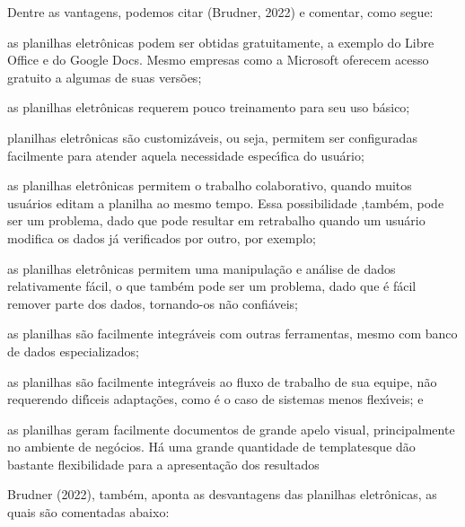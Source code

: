 \documentclass[
12pt,		%
openright,	%
twoside,  %
a4paper,			%
chapter=TITLE,		%
english,			%
french,				%
spanish,			%
brazil				%
]{USPSC-classe/USPSC}
\begin{document}
Dentre as vantagens, podemos citar (Brudner, 2022) e comentar, como segue:









\begin{alineas}
\item as planilhas eletr\^onicas podem ser obtidas gratuitamente, a exemplo do Libre Office e do Google Docs. Mesmo empresas como a Microsoft oferecem acesso gratuito a algumas de suas vers\~oes;
\item as planilhas eletr\^onicas requerem pouco treinamento para seu uso b\'asico;
\item planilhas eletr\^onicas s\~ao \textquotedbl customiz\'aveis\textquotedbl , ou seja, permitem ser configuradas facilmente para atender aquela necessidade espec\'{\i}fica do usu\'ario;
\item as planilhas eletr\^onicas permitem o trabalho colaborativo, quando muitos usu\'arios editam a planilha ao mesmo tempo. Essa possibilidade ,tamb\'em, pode ser um problema, dado que pode resultar em retrabalho quando um usu\'ario modifica os dados j\'a verificados por outro, por exemplo;
\item as planilhas eletr\^onicas permitem uma manipula\c{c}\~ao e an\'alise de dados relativamente f\'acil, o que tamb\'em pode ser um problema, dado que \'e f\'acil remover parte dos dados, tornando-os n\~ao confi\'aveis;
\item as planilhas s\~ao facilmente integr\'aveis com outras ferramentas, mesmo com banco de dados especializados;
\item as planilhas s\~ao facilmente integr\'aveis ao fluxo de trabalho de sua equipe, n\~ao requerendo dif\'{\i}ceis adapta\c{c}\~oes, como \'e o caso de sistemas menos flex\'{\i}veis; e
\item as planilhas geram facilmente documentos de grande apelo visual, principalmente no ambiente de neg\'ocios. H\'a uma grande quantidade de \textquotedbl templates\textquotedbl  que d\~ao bastante flexibilidade para a apresenta\c{c}\~ao dos resultados
\end{alineas}

 Brudner (2022), tamb\'em, aponta as desvantagens das planilhas eletr\^onicas, as quais s\~ao comentadas abaixo:
\end{document}
